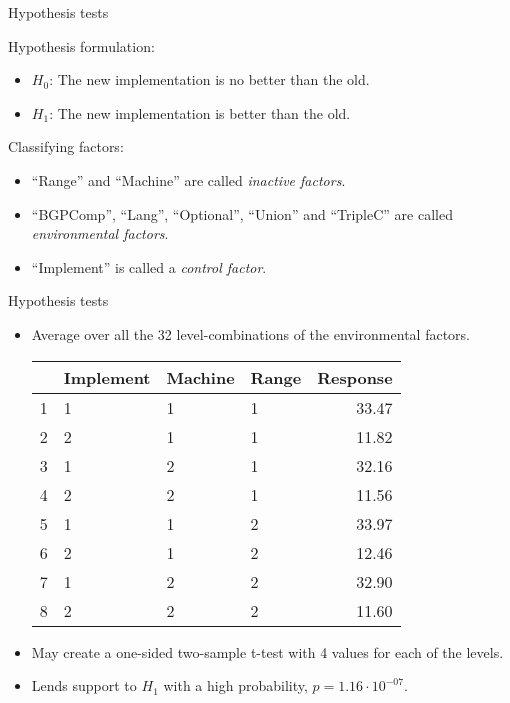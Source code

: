 \documentclass[english,handout,aspectratio=169]{ifislide}
\begin{document}
\begin{frame}{Hypothesis tests}

Hypothesis formulation:
  \begin{itemize}
  \item $H_0$: The new implementation is no better than the old.
  \item $H_1$: The new implementation is better than the old.
  \end{itemize}

Classifying factors:
  \begin{itemize}
  \item ``Range'' and ``Machine'' are called \emph{inactive factors}.
  \item ``BGPComp'', ``Lang'', ``Optional'', ``Union'' and ``TripleC''
    are called \emph{environmental factors}.
  \item ``Implement'' is called a \emph{control factor}.
  \end{itemize}

\end{frame}
\begin{frame}{Hypothesis tests}

\begin{itemize}
\item Average over all the 32 level-combinations of the environmental
  factors. 

\begin{table}[ht]
\begin{center}
\begin{tabular}{rlll|r}
  \hline
 & Implement & Machine & Range & Response \\ 
  \hline
1 & 1 & 1 & 1 & 33.47 \\ 
  2 & 2 & 1 & 1 & 11.82 \\ 
  3 & 1 & 2 & 1 & 32.16 \\ 
  4 & 2 & 2 & 1 & 11.56 \\ 
  5 & 1 & 1 & 2 & 33.97 \\ 
  6 & 2 & 1 & 2 & 12.46 \\ 
  7 & 1 & 2 & 2 & 32.90 \\ 
  8 & 2 & 2 & 2 & 11.60 \\ 
   \hline
\end{tabular}
\end{center}
\end{table}

\item May create a one-sided two-sample t-test with 4 values for each of the levels.
\item Lends support to $H_1$ with a high probability, $p=1.16 \cdot
10^{-07}$.

\end{itemize}

\end{frame}
\end{document}
